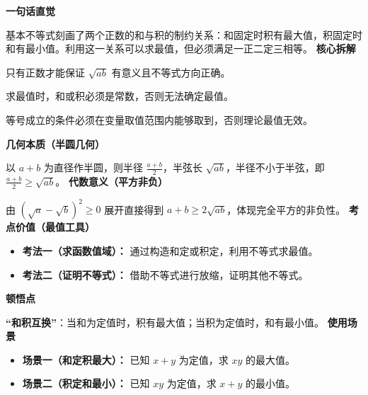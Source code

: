 \begin{explanationbox}
	\textbf{\textcolor{CExplanation}{一句话直觉}}

	基本不等式刻画了两个正数的和与积的制约关系：和固定时积有最大值，积固定时和有最小值。利用这一关系可以求最值，但必须满足一正二定三相等。
	\medskip
	\textbf{\textcolor{CExplanation}{核心拆解}}
	\begin{description}[style=nextline, leftmargin=2.8em, labelsep=0.5em, itemsep=0.45em]
		\item[\textbf{要点一（正数前提）：}] 只有正数才能保证 $\sqrt{ab}$ 有意义且不等式方向正确。
		\item[\textbf{要点二（定值条件）：}] 求最值时，和或积必须是常数，否则无法确定最值。
		\item[\textbf{要点三（等号检验）：}] 等号成立的条件必须在变量取值范围内能够取到，否则理论最值无效。
	\end{description}
	\medskip
	\textbf{\textcolor{CExplanation}{几何本质（半圆几何）}}

	以 $a+b$ 为直径作半圆，则半径 $\frac{a+b}{2}$，半弦长 $\sqrt{ab}$，半径不小于半弦，即 $\frac{a+b}{2}\ge\sqrt{ab}$。
	\medskip
	\textbf{\textcolor{CExplanation}{代数意义（平方非负）}}

	由 $(\sqrt{a}-\sqrt{b})^2\ge0$ 展开直接得到 $a+b\ge2\sqrt{ab}$，体现完全平方的非负性。
	\medskip
	\textbf{\textcolor{CExplanation}{考点价值（最值工具）}}
	\begin{itemize}[leftmargin=*, itemsep=0.5em, topsep=0.4em]
		\item \textbf{考法一（求函数值域）：} 通过构造和定或积定，利用不等式求最值。
		\item \textbf{考法二（证明不等式）：} 借助不等式进行放缩，证明其他不等式。
	\end{itemize}
	\medskip
	\textbf{\textcolor{CExplanation}{顿悟点}}

	\textbf{“和积互换”}：当和为定值时，积有最大值；当积为定值时，和有最小值。
	\medskip
	\textbf{\textcolor{CExplanation}{使用场景}}
	\begin{itemize}[leftmargin=*, itemsep=0.5em, topsep=0.4em]
		\item \textbf{场景一（和定积最大）：} 已知 $x+y$ 为定值，求 $xy$ 的最大值。
		\item \textbf{场景二（积定和最小）：} 已知 $xy$ 为定值，求 $x+y$ 的最小值。
	\end{itemize}
\end{explanationbox}
